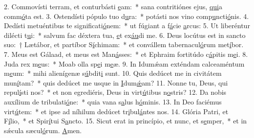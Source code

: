 2. Commovísti terram, et conturbásti \uline{e}am:~* sana contritiónes ejus, \uline{qui}a comm\uline{ó}ta est.
3. Ostendísti pópulo tuo d\uline{u}ra:~* potásti nos vino comp\uline{u}ncti\uline{ó}nis.
4. Dedísti metuéntibus te significati\uline{ó}nem:~* ut fúgiant a f\uline{á}cie \uline{a}rcus:
5. Ut liberéntur dilécti t\uline{u}i:~* salvum fac déxtera tua, \uline{e}t ex\uline{áu}di me.
6. Deus locútus est in sancto suo:~† Lætábor, et partíbor S\uline{í}chimam:~* et convállem tabernacul\uline{ó}rum met\uline{í}bor.
7. Meus est Gálaad, et meus est Man\uline{á}sses:~* et Ephraim fortitúdo c\uline{á}pitis m\uline{e}i.
8. Juda rex m\uline{e}us:~* Moab olla sp\uline{e}i m\uline{e}æ.
9. In Idumǽam exténdam calceaméntum m\uline{e}um:~* mihi alienígenæ s\uline{ú}bdit\uline{i} sunt.
10. Quis dedúcet me in civitátem mun\uline{í}tam?~* quis dedúcet me usque in \uline{I}dum\uline{ǽ}am?
11. Nonne tu, Deus, qui repul\uline{í}sti nos?~* et non egrediéris, Deus in virt\uline{ú}tibus n\uline{o}stris?
12. Da nobis auxílium de tribulati\uline{ó}ne:~* quia vana s\uline{a}lus h\uline{ó}minis.
13. In Deo faciémus virt\uline{ú}tem:~* et ipse ad níhilum dedúcet tr\uline{i}bul\uline{á}ntes nos.
14. Glória Patri, et F\uline{í}lio,~* et Spir\uline{í}tui S\uline{a}ncto.
15. Sicut erat in princípio, et nunc, et s\uline{e}mper,~* et in sǽcula sæcul\uline{ó}rum. \uline{A}men.
